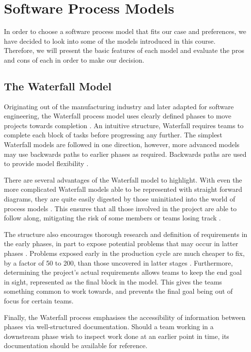 \section{Software Process Models}
In order to choose a software process model that fits our case and preferences, we have decided to look into some of the models introduced in this course. Therefore, we will present the basic features of each model and evaluate the pros and cons of each in order to make our decision.

\subsection{The Waterfall Model}

Originating out of the manufacturing industry and later adapted for software engineering, the Waterfall process model uses clearly defined phases to move projects towards completion \cite{Benington}. An intuitive structure, Waterfall requires teams to complete each block of tasks before progressing any further. The simplest Waterfall models are followed in one direction, however, more advanced models may use backwards paths to earlier phases as required. Backwards paths are used to provide model flexibility \cite{Royce}.

There are several advantages of the Waterfall model to highlight. With even the more complicated Waterfall models able to be represented with straight forward diagrams, they are quite easily digested by those uninitiated into the world of process models \cite{Hughey}. This ensures that all those involved in the project are able to follow along, mitigating the risk of some members or teams losing track \cite{Lucidchart}.

The structure also encourages thorough research and definition of requirements in the early phases, in part to expose potential problems that may occur in latter phases \cite{Royce}. Problems exposed early in the production cycle are much cheaper to fix, by a factor of 50 to 200, than those uncovered in latter stages \cite{McConnell_1996}. Furthermore, determining the project’s actual requirements allows teams to keep the end goal in sight, represented as the final block in the model. This gives the teams something common to work towards, and prevents the final goal being out of focus for certain teams.

Finally, the Waterfall process emphasises the accessibility of information between phases via well-structured documentation. Should a team working in a downstream phase wish to inspect work done at an earlier point in time, its documentation should be available for reference.

